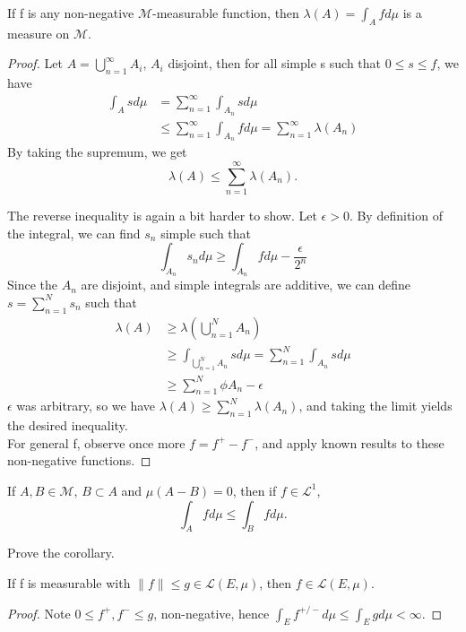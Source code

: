 \documentclass[11pt]{scrartcl}
\begin{document}
\begin{theorem}
If f is any non-negative $\mathcal{M}$-measurable function, then $\lambda(A) = \int_A f d\mu $ is a measure on $\mathcal{M}$.
\end{theorem}
\begin{proof}
Let $A = \bigcup_{n=1}^\infty A_i$, $A_i$ disjoint, then for all simple s such that $0\leq s\leq f$, we have 
\begin{align*}
\int_A s d\mu & = \sum_{n = 1}^{\infty} \int_{A_n} s d\mu \\
& \leq \sum_{n = 1}^{\infty} \int_{A_n} f d\mu =  \sum_{n = 1}^{\infty} \lambda(A_n)
\end{align*}
By taking the supremum, we get $$\lambda(A)\leq \sum_{n = 1}^{\infty} \lambda(A_n).$$

The reverse inequality is again a bit harder to show. Let $\epsilon>0$. By definition of the integral, we can find $s_n$ simple such that 
$$ \int_{A_n} s_n d\mu \geq \int_{A_n} f d\mu - \frac{\epsilon}{2^n}$$
Since the $A_n$ are disjoint, and simple integrals are additive, we can define $s = \sum_{n=1}^N s_n$ such that
\begin{align*}
\lambda(A) & \geq \lambda(\bigcup_{n=1}^N A_n) \\
& \geq \int_{\bigcup_{n=1}^N A_n} s d\mu = \sum_{n=1}^N \int_{A_n} s d\mu \\
& \geq \sum_{n=1}^N \phi{A_n} - \epsilon
\end{align*} 
$\epsilon$ was arbitrary, so we have $\lambda(A) \geq \sum_{n=1}^N \lambda(A_n)$, and taking the limit yields the desired inequality.\\
For general f, observe once more $f = f^+ - f^-$, and apply known results to these non-negative functions.
\end{proof}

\begin{corollary}
If $A,B\in \mathcal{M}$, $B\subset A$ and $\mu(A - B) = 0$, then if $f \in \mathscr{L}^1$, 
$$\int_A f d\mu \leq \int_B f d\mu. $$
\end{corollary}

\begin{exercise}
Prove the corollary.
\end{exercise}

\begin{theorem}
If f is measurable with $\|f\| \leq g \in \mathscr{L}(E,\mu)$, then $f \in \mathscr{L}(E,\mu)$.
\end{theorem}
\begin{proof}
Note $0 \leq f^+,f^- \leq g$, non-negative, hence $\int_{E} f^{+/-} d\mu \leq \int_{E} g d\mu < \infty$. 
\end{proof}
\end{document}
